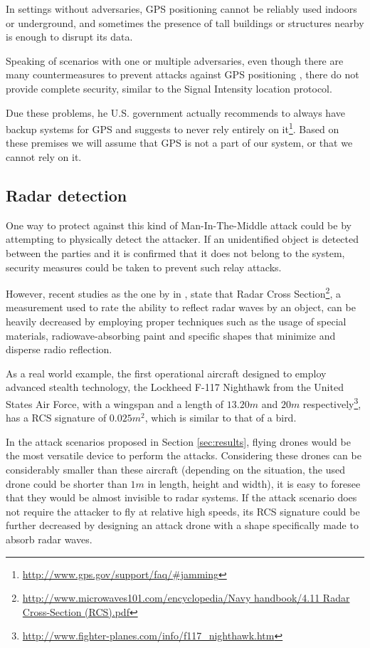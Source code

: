 \documentclass{article}
\begin{document}
In settings without adversaries, GPS positioning cannot be reliably used indoors or underground, and sometimes the presence of tall buildings or structures nearby is enough to disrupt its data.

Speaking of scenarios with one or multiple adversaries, even though there are many countermeasures to prevent attacks against GPS positioning \cite{warner2003gps, wen2005countermeasures, jafarnia2012gps}, there do not provide complete security, similar to the Signal Intensity location protocol.

Due these problems, he U.S. government actually recommends to always have backup systems for GPS and suggests to never rely entirely on it\footnote{\url{http://www.gps.gov/support/faq/#jamming}}. Based on these premises we will assume that GPS is not a part of our system, or that we cannot rely on it.

\subsection{Radar detection}

One way to protect against this kind of Man-In-The-Middle attack could be by attempting to physically detect the attacker. If an unidentified object is detected between the parties and it is confirmed that it does not belong to the system, security measures could be taken to prevent such relay attacks.

However, recent studies as the one by \citeauthor{cadirci2009rf} in \cite{cadirci2009rf}, state that Radar Cross Section\footnote{\url{http://www.microwaves101.com/encyclopedia/Navy handbook/4.11 Radar Cross-Section (RCS).pdf}}, a measurement used to rate the ability to reflect radar waves by an object, can be heavily decreased by employing proper techniques such as the usage of special materials, radiowave-absorbing paint and specific shapes that minimize and disperse radio reflection.

As a real world example, the first operational aircraft designed to employ advanced stealth technology, the Lockheed F-117 Nighthawk from the United States Air Force, with a wingspan and a length of $13.20m$ and $20m$ respectively\footnote{\url{http://www.fighter-planes.com/info/f117_nighthawk.htm}}, has a RCS signature of $0.025m^2$, which is similar to that of a bird\cite{cadirci2009rf}.

In the attack scenarios proposed in Section \ref{sec:results}, flying drones would be the most versatile device to perform the attacks. Considering these drones can be considerably smaller than these aircraft (depending on the situation, the used drone could be shorter than $1m$ in length, height and width), it is easy to foresee that they would be almost invisible to radar systems. If the attack scenario does not require the attacker to fly at relative high speeds, its RCS signature could be further decreased by designing an attack drone with a shape specifically made to absorb radar waves. 
\end{document}
